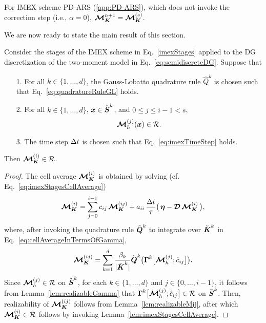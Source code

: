 \begin{rem}
  For IMEX scheme PD-ARS (\ref{app:PD-ARS}), which does not invoke the correction step (i.e., $\alpha=0$), $\boldsymbol{\mathcal{M}}_{\boldsymbol{K}}^{n+1}=\boldsymbol{\mathcal{M}}_{\boldsymbol{K}}^{(s)}$.  
\end{rem}

We are now ready to state the main result of this section.  
\begin{theorem}
  Consider the stages of the IMEX scheme in Eq.~\eqref{imexStages} applied to the DG discretization of the two-moment model in Eq.~\eqref{eq:semidiscreteDG}.  
  Suppose that
  \begin{itemize}
    \item[1.] For all $k\in\{1,\ldots,d\}$, the Gauss-Lobatto quadrature rule $\hat{Q}^{k}$ is chosen such that Eq.~\eqref{eq:quadratureRuleGL} holds.  
    \item[2.] For all $k\in\{1,\ldots,d\}$, $\boldsymbol{x}\in\hat{\boldsymbol{S}}^{k}$, and $0\le j \le i-1<s$, 
    \begin{equation*}
      \boldsymbol{\mathcal{M}}_{h}^{(j)}(\boldsymbol{x})\in\mathcal{R}.
    \end{equation*}
    \item[3.] The time step $\Delta t$ is chosen such that Eq.~\eqref{eq:imexTimeStep} holds.  
  \end{itemize}
  Then $\boldsymbol{\mathcal{M}}_{\boldsymbol{K}}^{(i)}\in\mathcal{R}$.  
  \label{the:realizableDGIMEX}
\end{theorem}
\begin{proof}
  The cell average $\boldsymbol{\mathcal{M}}_{\boldsymbol{K}}^{(i)}$ is obtained by solving (cf. Eq.~\eqref{eq:imexStagesCellAverage})
  \begin{equation*}
    \boldsymbol{\mathcal{M}}_{\boldsymbol{K}}^{(i)}
    =\sum_{j=0}^{i-1}c_{ij}\,\boldsymbol{\mathcal{M}}_{\boldsymbol{K}}^{(ij)}
    +a_{ii}\,\frac{\Delta t}{\tau}\big(\,\boldsymbol{\eta}-\boldsymbol{\mathcal{D}}\,\boldsymbol{\mathcal{M}}_{\boldsymbol{K}}^{(i)}\,\big),
  \end{equation*}
  where, after invoking the quadrature rule $\tilde{\boldsymbol{Q}}^{k}$ to integrate over $\tilde{\boldsymbol{K}}^{k}$ in Eq.~\eqref{eq:cellAverageInTermsOfGamma},
  \begin{equation*}
    \boldsymbol{\mathcal{M}}_{\boldsymbol{K}}^{(ij)}
    =\sum_{k=1}^{d}\frac{\beta_{k}}{|\tilde{\boldsymbol{K}}^{k}|}\tilde{\boldsymbol{Q}}^{k}\big(\boldsymbol{\Gamma}^{k}\big[\boldsymbol{\mathcal{M}}_{h}^{(j)};\hat{c}_{ij}\big]\big).  
  \end{equation*}
  Since $\boldsymbol{\mathcal{M}}_{h}^{(j)}\in\mathcal{R}$ on $\hat{\boldsymbol{S}}^{k}$, for each $k\in\{1,\ldots,d\}$ and $j\in\{0,\ldots,i-1\}$, it follows from Lemma~\ref{lem:realizableGamma} that $\boldsymbol{\Gamma}^{k}\big[\boldsymbol{\mathcal{M}}_{h}^{(j)};\hat{c}_{ij}\big]\in\mathcal{R}$ on $\tilde{\boldsymbol{S}}^{k}$.  
  Then, realizability of $\boldsymbol{\mathcal{M}}_{\boldsymbol{K}}^{(ij)}$ follows from Lemma~\ref{lem:realizableMij}, after which $\boldsymbol{\mathcal{M}}_{\boldsymbol{K}}^{(i)}\in\mathcal{R}$ follows by invoking Lemma~\ref{lem:imexStagesCellAverage}.  
\end{proof}